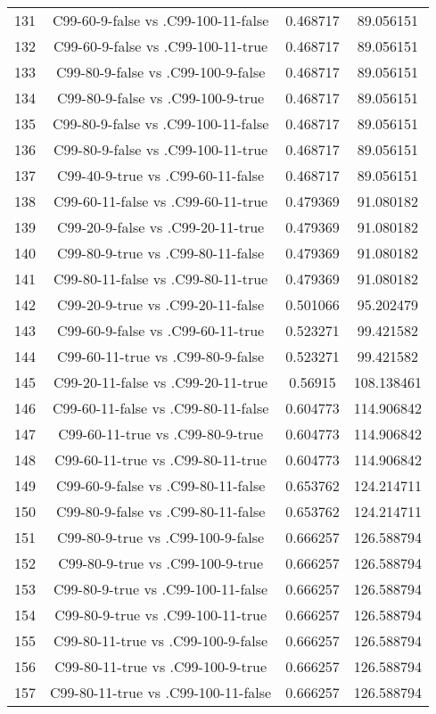 \documentclass[a4paper,10pt]{article}
\begin{document}
\begin{landscape}
\begin{table}[!htp]
\begin{tabular}{cccc}
131&C99-60-9-false vs .C99-100-11-false&0.468717&89.056151\\
132&C99-60-9-false vs .C99-100-11-true&0.468717&89.056151\\
133&C99-80-9-false vs .C99-100-9-false&0.468717&89.056151\\
134&C99-80-9-false vs .C99-100-9-true&0.468717&89.056151\\
135&C99-80-9-false vs .C99-100-11-false&0.468717&89.056151\\
136&C99-80-9-false vs .C99-100-11-true&0.468717&89.056151\\
137&C99-40-9-true vs .C99-60-11-false&0.468717&89.056151\\
138&C99-60-11-false vs .C99-60-11-true&0.479369&91.080182\\
139&C99-20-9-false vs .C99-20-11-true&0.479369&91.080182\\
140&C99-80-9-true vs .C99-80-11-false&0.479369&91.080182\\
141&C99-80-11-false vs .C99-80-11-true&0.479369&91.080182\\
142&C99-20-9-true vs .C99-20-11-false&0.501066&95.202479\\
143&C99-60-9-false vs .C99-60-11-true&0.523271&99.421582\\
144&C99-60-11-true vs .C99-80-9-false&0.523271&99.421582\\
145&C99-20-11-false vs .C99-20-11-true&0.56915&108.138461\\
146&C99-60-11-false vs .C99-80-11-false&0.604773&114.906842\\
147&C99-60-11-true vs .C99-80-9-true&0.604773&114.906842\\
148&C99-60-11-true vs .C99-80-11-true&0.604773&114.906842\\
149&C99-60-9-false vs .C99-80-11-false&0.653762&124.214711\\
150&C99-80-9-false vs .C99-80-11-false&0.653762&124.214711\\
151&C99-80-9-true vs .C99-100-9-false&0.666257&126.588794\\
152&C99-80-9-true vs .C99-100-9-true&0.666257&126.588794\\
153&C99-80-9-true vs .C99-100-11-false&0.666257&126.588794\\
154&C99-80-9-true vs .C99-100-11-true&0.666257&126.588794\\
155&C99-80-11-true vs .C99-100-9-false&0.666257&126.588794\\
156&C99-80-11-true vs .C99-100-9-true&0.666257&126.588794\\
157&C99-80-11-true vs .C99-100-11-false&0.666257&126.588794\\

\end{tabular}
\end{table}
\end{landscape}
\end{document}
